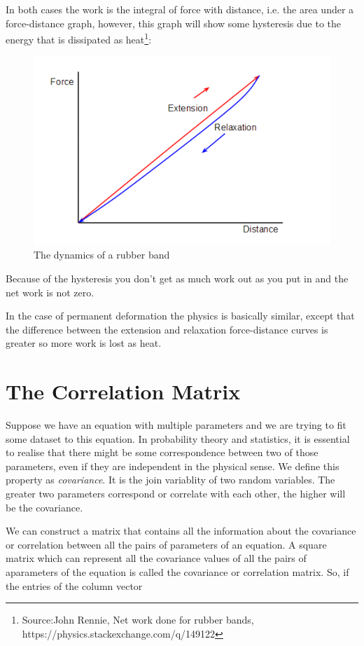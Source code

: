 In both cases the work is the integral of force with distance, i.e. the area under a force-distance graph, however, this graph will show some hysteresis due to the energy that is dissipated as heat\footnote{Source:John Rennie, Net work done for rubber bands, https://physics.stackexchange.com/q/149122}:
\begin{figure}[H]
	\centering
	\includegraphics[scale=0.5]{Rubberband hysteresis.png}
	\caption{The dynamics of a rubber band}
	\label{fig:mb-fe-0}
\end{figure}
Because of the hysteresis you don't get as much work out as you put in and the net work is not zero.

In the case of permanent deformation the physics is basically similar, except that the difference between the extension and relaxation force-distance curves is greater so more work is lost as heat.

\section{The Correlation Matrix}

Suppose we have an equation with multiple parameters and we are trying to fit some dataset to this equation. In probability theory and statistics, it is essential to realise that there might be some correspondence between two of those parameters, even if they are independent in the physical sense. We define this property as \textit{covariance}. It is the join variablity of two random variables. The greater two parameters correspond or correlate with each other, the higher will be the covariance.

We can construct a matrix that contains all the information about the covariance or correlation between all the pairs of parameters of an equation. A square matrix which can represent all the covariance values of all the pairs of aparameters of the equation is called the covariance or correlation matrix. So, if the entries of the column vector 

